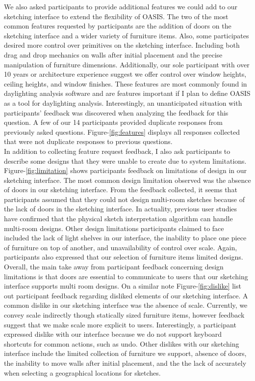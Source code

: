 We also asked participants to provide additional features we could add to our sketching interface to extend the flexibility of OASIS.
The two of the most common features requested by participants are the addition of doors on the sketching interface and a wider variety of furniture items.
Also, some participates desired more control over primitives on the sketching interface. 
Including both drag and drop mechanics on walls after initial placement and the precise manipulation of furniture dimensions.
Additionally, our sole participant with over 10 years or architecture experience suggest we offer control over window heights, ceiling heights, and window finishes.
These features are most commonly found in daylighting analysis software and are features important if I plan to define OASIS as a tool for daylighting analysis.
Interestingly, an unanticipated situation with participants' feedback was discovered when analyzing the feedback for this question.
A few of our 14 participants provided duplicate responses from previously asked questions.
Figure-\ref{fig:features} displays  all responses collected that were not duplicate responses to previous questions. \\
 
In addition to collecting feature request feedback, I also ask participants to describe some designs that they were unable to create due to system limitations.
Figure-\ref{fig:limitation} shows participants feedback on limitations of design in our sketching interface.
The most common design limitation observed was the absence of doors in our sketching interface.
From the feedback collected, it seems that participants assumed that they could not design multi-room sketches because of the lack of doors in the sketching interface.
In actuality, previous user studies have confirmed that the physical sketch interpretation algorithm can handle multi-room designs\cite{}.
Other design limitations participants claimed to face included the lack of light shelves in our interface, the inability to place one piece of furniture on top of another, and unavailability of control over scale.
Again, participants also expressed that our selection of furniture items limited designs. \\

Overall, the main take away from participant feedback concerning design limitations is that doors are essential to communicate to users that our sketching interface supports multi room designs.
On a similar note Figure-\ref{fig:dislike} list out participant feedback regarding disliked elements of our sketching interface.
A common dislike in our sketching interface was the absence of scale.
Currently, we convey scale indirectly though statically sized furniture items, however feedback suggest that we make scale more explicit to users.
Interestingly, a participant expressed dislike with our interface because we do not support keyboard shortcuts for common actions, such as undo.
Other dislikes with our sketching interface include the limited collection of furniture we support, absence of doors, the inability to move walls after initial placement, and the the lack of accurately when selecting a geographical locations for sketches.\\

